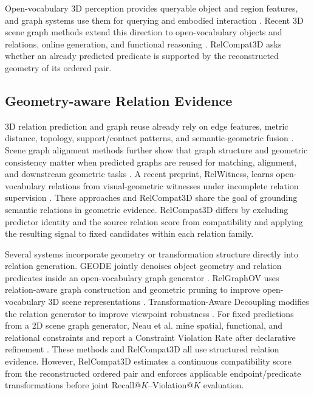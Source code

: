 Open-vocabulary 3D perception provides queryable object and region features, and graph systems use them for querying and embodied interaction \cite{peng2023openscene,takmaz2023openmask3d,gu2024conceptgraphs,werby2024hierarchical,maggio2024clio}.
Recent 3D scene graph methods extend this direction to open-vocabulary objects and relations, online generation, and functional reasoning
\cite{koch2024open3dsg,chen2024clip,hou2025fross,zhang2025open,wang2025open}. RelCompat3D asks whether an already predicted predicate is supported by the reconstructed geometry of its ordered pair. 

\subsection{Geometry-aware Relation Evidence}
3D relation prediction and graph reuse already rely on edge features, metric distance, topology, support/contact patterns, and semantic-geometric fusion \cite{zhang2021exploiting,feng20233d,xie2024sg,huang2025fireplace,shao2025great,sarkar2023sgaligner}. Scene graph alignment methods further show that graph structure and geometric consistency matter when predicted graphs are reused for matching, alignment, and downstream geometric tasks \cite{sarkar2023sgaligner, xie2024sg}. A recent preprint, RelWitness, learns open-vocabulary relations from visual-geometric witnesses under incomplete relation supervision \cite{nguyen2026relwitness}. These approaches and RelCompat3D share the goal of grounding semantic relations in geometric evidence. RelCompat3D differs by excluding predictor identity and the source relation score from compatibility and applying the resulting signal to fixed candidates within each relation family. 

Several systems incorporate geometry or transformation structure directly into relation generation. GEODE jointly denoises object geometry and relation predicates inside an open-vocabulary graph generator \cite{feng2026geode}. RelGraphOV uses relation-aware graph construction and geometric pruning to improve open-vocabulary 3D scene representations \cite{chen2026beyond}. Transformation-Aware Decoupling modifies the relation generator to improve viewpoint robustness \cite{sun2026not}. For fixed predictions from a 2D scene graph generator, Neau et al. mine spatial, functional, and relational constraints and report a Constraint Violation Rate after declarative refinement \cite{neau2026visual}. These methods and RelCompat3D all use structured relation evidence. However, RelCompat3D estimates a continuous compatibility score from the reconstructed ordered pair and enforces applicable endpoint/predicate transformations before joint Recall@$K$--Violation@$K$ evaluation. 


